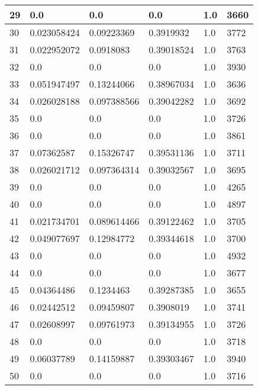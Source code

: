 \begin{longtable}{|l|l|l|l|l|l|}
29 & 0.0 & 0.0 & 0.0 & 1.0 & 3660 \\ \hline 
30 & 0.023058424 & 0.09223369 & 0.3919932 & 1.0 & 3772 \\ \hline 
31 & 0.022952072 & 0.0918083 & 0.39018524 & 1.0 & 3763 \\ \hline 
32 & 0.0 & 0.0 & 0.0 & 1.0 & 3930 \\ \hline 
33 & 0.051947497 & 0.13244066 & 0.38967034 & 1.0 & 3636 \\ \hline 
34 & 0.026028188 & 0.097388566 & 0.39042282 & 1.0 & 3692 \\ \hline 
35 & 0.0 & 0.0 & 0.0 & 1.0 & 3726 \\ \hline 
36 & 0.0 & 0.0 & 0.0 & 1.0 & 3861 \\ \hline 
37 & 0.07362587 & 0.15326747 & 0.39531136 & 1.0 & 3711 \\ \hline 
38 & 0.026021712 & 0.097364314 & 0.39032567 & 1.0 & 3695 \\ \hline 
39 & 0.0 & 0.0 & 0.0 & 1.0 & 4265 \\ \hline 
40 & 0.0 & 0.0 & 0.0 & 1.0 & 4897 \\ \hline 
41 & 0.021734701 & 0.089614466 & 0.39122462 & 1.0 & 3705 \\ \hline 
42 & 0.049077697 & 0.12984772 & 0.39344618 & 1.0 & 3700 \\ \hline 
43 & 0.0 & 0.0 & 0.0 & 1.0 & 4932 \\ \hline 
44 & 0.0 & 0.0 & 0.0 & 1.0 & 3677 \\ \hline 
45 & 0.04364486 & 0.1234463 & 0.39287385 & 1.0 & 3655 \\ \hline 
46 & 0.02442512 & 0.09459807 & 0.3908019 & 1.0 & 3741 \\ \hline 
47 & 0.02608997 & 0.09761973 & 0.39134955 & 1.0 & 3726 \\ \hline 
48 & 0.0 & 0.0 & 0.0 & 1.0 & 3718 \\ \hline 
49 & 0.06037789 & 0.14159887 & 0.39303467 & 1.0 & 3940 \\ \hline 
50 & 0.0 & 0.0 & 0.0 & 1.0 & 3716 \\ \hline 
\end{longtable}